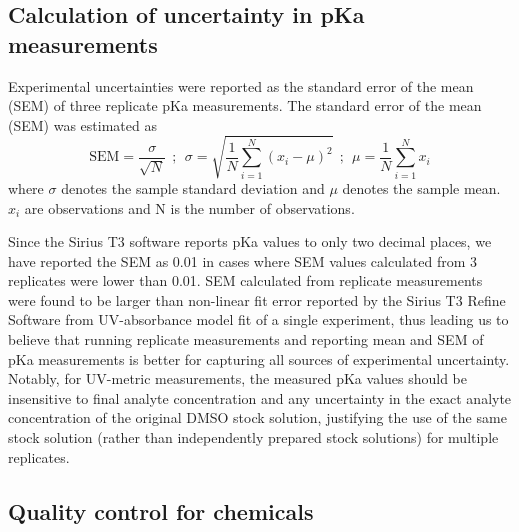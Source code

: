 \documentclass[9pt,lineno]{elife}
\begin{document}
\subsection{Calculation of uncertainty in pKa measurements}

Experimental uncertainties were reported as the standard error of the mean (SEM) of three replicate pKa measurements. 
The standard error of the mean (SEM) was estimated as
\begin{equation}
\mathrm{SEM} = \frac{\sigma}{\sqrt{N}}  \:\: ; \:\: \sigma = \sqrt{\frac{1}{N} \sum_{i=1}^N (x_i - \mu)^2 } \:\: ; \:\: \mu = \frac{1}{N} \sum_{i=1}^N x_i
\label{eq:sem}
\end{equation}
where $\sigma$ denotes the sample standard deviation and $\mu$ denotes the sample mean. $x_i$ are observations and N is the number of observations. 

Since the Sirius T3 software reports pKa values to only two decimal places, we have reported the SEM as 0.01 in cases where SEM values calculated from 3 replicates were lower than 0.01. 
SEM calculated from replicate measurements were found to be larger than non-linear fit error reported by the Sirius T3 Refine Software from UV-absorbance model fit of a single experiment, thus leading us to believe that running replicate measurements and reporting mean and SEM of pKa measurements is better for capturing all sources of experimental uncertainty.
Notably, for UV-metric measurements, the measured pKa values should be insensitive to final analyte concentration and any uncertainty in the exact analyte concentration of the original DMSO stock solution, justifying the use of the same stock solution (rather than independently prepared stock solutions) for multiple replicates.

\subsection{Quality control for chemicals}
\end{document}
